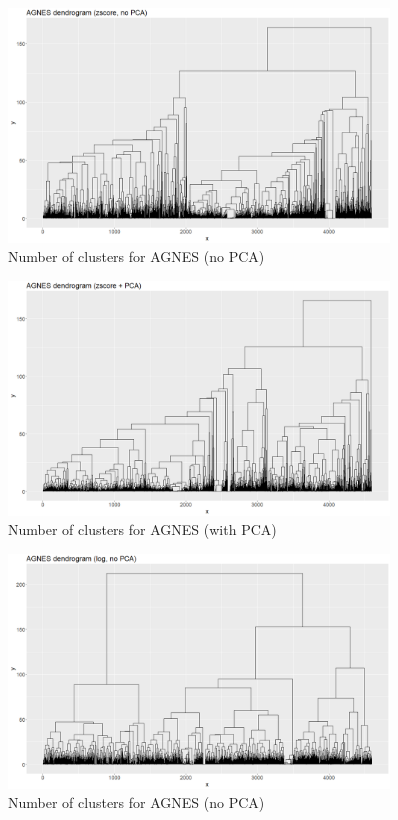 \documentclass{article}
\begin{document}
	\begin{figure}[h]
		\centering
		\includegraphics[width=0.9\textwidth]{proj2_plots/dendro_scaled_nopca.png}
		\caption{Number of clusters for AGNES (no PCA)}
		\label{fig::clust_num_agnes_scaled}
	\end{figure}

	\begin{figure}[h]
		\centering
		\includegraphics[width=0.9\textwidth]{proj2_plots/dendro_scaled_pca.png}
		\caption{Number of clusters for AGNES (with PCA)}
		\label{fig::clust_num_agnes_scaled_pca}
	\end{figure}

	\begin{figure}[h]
		\centering
		\includegraphics[width=0.9\textwidth]{proj2_plots/dendro_log_nopca.png}
		\caption{Number of clusters for AGNES (no PCA)}
		\label{fig::clust_num_agnes_log}
	\end{figure}
\end{document}
